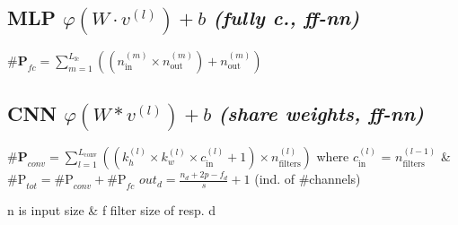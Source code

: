 \subsection*{MLP \quad \color{Black}$\varphi(W \cdot v^{(l)}) + b$ \normalfont \textit{(fully c., ff-nn)} }
$\textbf{\#P}_{fc} = \sum_{m=1}^{L_{\text{fc}}} \left( (n_{\text{in}}^{(m)} \times n_{\text{out}}^{(m)}) + n_{\text{out}}^{(m)} \right)$ \\[-7pt]


\subsection*{CNN \quad \color{Black}$\varphi(W * v^{(l)}) + b$ \normalfont \textit{(share weights, ff-nn)} }
$\textbf{\#P}_{conv} = \sum_{l=1}^{L_{\text{conv}}} \left( (k_h^{(l)} \times k_w^{(l)} \times c_{\text{in}}^{(l)} + 1) \times n_{\text{filters}}^{(l)} \right)
$
where $c_{\text{in}}^{(l)}$ =  $n_{\text{filters}}^{(l-1)}$ \& $\text{\#P}_{tot} = \text{\#P}_{conv} + \text{\#P}_{fc}$
$out_d = \frac{n_d + 2p - f_d}{s} + 1$  (ind. of \#channels)

n is input size \& f filter size of resp. d
